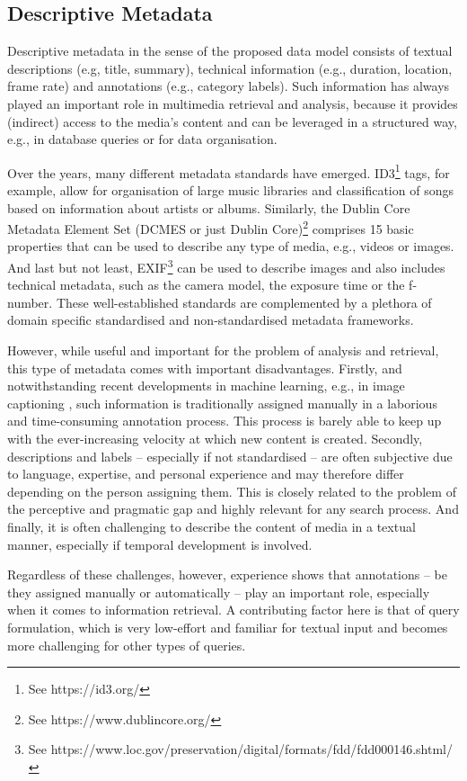 \subsection{Descriptive Metadata}
Descriptive metadata in the sense of the proposed data model consists of textual descriptions (e.g, title, summary), technical information (e.g., duration, location, frame rate) and annotations (e.g., category labels). Such information has always played an important role in multimedia retrieval and analysis, because it provides (indirect) access to the media's content and can be leveraged in a structured way, e.g., in database queries or for data organisation.

Over the years, many different metadata standards have emerged. ID3\footnote{See https://id3.org/} tags, for example, allow for organisation of large music libraries and classification of songs based on information about artists or albums. Similarly, the Dublin Core Metadata Element Set (DCMES or just Dublin Core)\footnote{See https://www.dublincore.org/} comprises 15 basic properties that can be used to describe any type of media, e.g., videos or images. And last but not least, EXIF\footnote{See https://www.loc.gov/preservation/digital/formats/fdd/fdd000146.shtml/} can be used to describe images and also includes technical metadata, such as the camera model, the exposure time or the f-number. These well-established standards are complemented by a plethora of domain specific standardised and non-standardised metadata frameworks.

However, while useful and important for the problem of analysis and retrieval, this type of metadata comes with important disadvantages. Firstly, and notwithstanding recent developments in machine learning, e.g., in image captioning \cite{Hossain:2019Comprehensive}, such information is traditionally assigned manually in a laborious and time-consuming annotation process. This process is barely able to keep up with the ever-increasing velocity at which new content is created. Secondly, descriptions and labels -- especially if not standardised -- are often subjective due to language, expertise, and personal experience and may therefore differ depending on the person assigning them. This is closely related to the problem of the perceptive and pragmatic gap \cite{Rossetto:2018Multi} and highly relevant for any search process. And finally, it is often challenging to describe the content of media in a textual manner, especially if temporal development is involved.

Regardless of these challenges, however, experience shows that annotations -- be they assigned manually or automatically -- play an important role, especially when it comes to information retrieval. A contributing factor here is that of query formulation, which is very low-effort and familiar for textual input and becomes more challenging for other types of queries.

